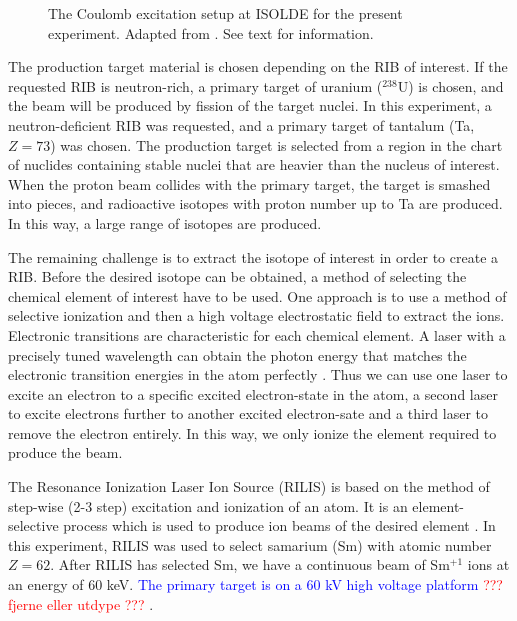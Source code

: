 \documentclass[twoside,english]{uiofysmaster/uiofysmaster}
\begin{document}
\begin{figure}[ht]
	\centering
	
	\caption{The Coulomb excitation setup at ISOLDE for the present experiment. Adapted from \cite{Klintefjord}. See text for information.}
	\label{fig:Coulex}
\end{figure}

The production target material is chosen depending on the RIB of interest. 
If the requested RIB is neutron-rich, a primary target of uranium ($^{238}$U) is chosen, and the beam will be produced by fission of the target nuclei.
In this experiment, a neutron-deficient RIB was requested, and a primary target of tantalum (Ta, $Z = 73$) was chosen.
The production target is selected from a region in the chart of nuclides containing stable nuclei that are heavier than the nucleus of interest.
When the proton beam collides with the primary target, the target is smashed into pieces, and radioactive isotopes with proton number up to Ta are produced.
In this way, a large range of isotopes are produced. 

The remaining challenge is to extract the isotope of interest in order to create a RIB. 
Before the desired isotope can be obtained, a method of selecting the chemical element of interest have to be used.
One approach is to use a method of selective ionization and then a high voltage electrostatic field to extract the ions. 
Electronic transitions are characteristic for each chemical element. 
A laser with a precisely tuned wavelength can obtain the photon energy that matches the electronic transition energies in the atom perfectly \cite{RILIS-web, RILIS2013}. 
Thus we can use one laser to excite an electron to a specific excited electron-state in the atom, a second laser to excite electrons further to another excited electron-sate and a third laser to remove the electron entirely. 
In this way, we only ionize the element required to produce the beam. 

The Resonance Ionization Laser Ion Source (RILIS) is based on the method of step-wise (2-3 step) excitation and ionization of an atom. 
It is an element-selective process which is used to produce ion beams of the desired element \cite{RILIS}. 
In this experiment, RILIS was used to select samarium (Sm) with atomic number $Z = 62$. 
After RILIS has selected Sm, we have a continuous beam of Sm$^{+1}$ ions at an energy of 60 keV. 
\textcolor{blue}{The primary target is on a 60 kV high voltage platform} \textcolor{red}{??? fjerne eller utdype ???} \cite{ISOLDE-web, TIF}. 
\end{document}
